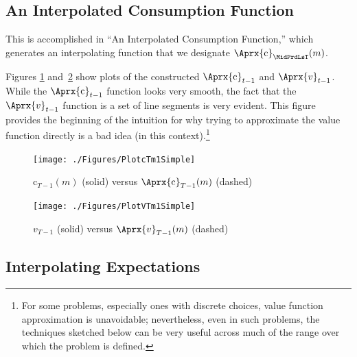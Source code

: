 \documentclass[titlepage, headings=optiontotocandhead]{econtex}
\begin{document}
\hypertarget{an-interpolated-consumption-function}{}
\subsection{An Interpolated Consumption Function} \label{subsec:LinInterp}


This is accomplished in ``An Interpolated Consumption Function,'' which generates an interpolating function that we designate $\Aprx{\mathrm{c}}_{\MidPrdLsT}(m)$. %


Figures \ref{fig:PlotcTm1Simple} and~\ref{fig:PlotVTm1Simple} show
plots of the constructed $\Aprx{\mathrm{c}}_{t-1}$ and $\Aprx{v}_{t-1}$. While the $\Aprx{\mathrm{c}}_{t-1}$ function looks very smooth, the fact that the $\Aprx{v}_{t-1}$ function is a set of line segments is very evident.  This figure provides the beginning of the intuition for why trying to approximate the value function directly is a bad idea (in this context).\footnote{For some problems, especially ones with discrete choices, value function approximation is unavoidable; nevertheless, even in such problems, the techniques sketched below can be very useful across much of the range over which the problem is defined.}

\hypertarget{PlotcTm1Simple}{}
\begin{figure}
  \centerline{\texttt{[image: ./Figures/PlotcTm1Simple]}}
  \caption{$\mathrm{c}_{T-1}(m)$ (solid) versus $\Aprx{\mathrm{c}}_{T-1}(m)$ (dashed)}
  \label{fig:PlotcTm1Simple}
\end{figure}

\hypertarget{PlotvTm1Simple}{}
\begin{figure}
  \centerline{\texttt{[image: ./Figures/PlotVTm1Simple]}}
  \caption{$v_{T-1}$ (solid) versus $\Aprx{v}_{T-1}(m)$ (dashed)}
  \label{fig:PlotVTm1Simple}
\end{figure}



\hypertarget{interpolating-expectations}{}
\subsection{Interpolating Expectations}
\end{document}
